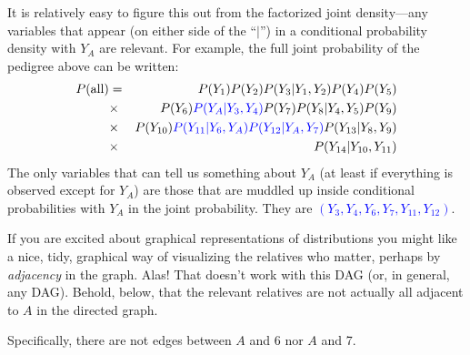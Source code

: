 \documentclass[11pt]{article}
\begin{document}
It is relatively easy to figure this out from the factorized joint density---any variables 
that appear (on either side of the ``$|$'') in a conditional probability density with 
$Y_A$ are relevant. For example, the full joint probability of the pedigree above can be written:
\begin{eqnarray*}
P(\mathrm{all}) & = & P(Y_1)P(Y_2)P(Y_3|Y_1,Y_2)P(Y_4)P(Y_5) \\
  & \times  & P(Y_6)\textcolor{blue}{P(Y_A|Y_3,Y_4)}P(Y_7)P(Y_8|Y_4,Y_5)P(Y_9) \\
  & \times  & P(Y_{10})\textcolor{blue}{P(Y_{11}|Y_6,Y_A)P(Y_{12}|Y_A,Y_7)}P(Y_{13}|Y_8,Y_9) \\
  & \times  & P(Y_{14}|Y_{10},Y_{11})
\end{eqnarray*}
The only variables that can tell us something about $Y_A$ (at least if everything is 
observed except for $Y_A$) are those that are muddled up inside conditional probabilities
with $Y_A$ in the joint
probability.  They are \textcolor{blue}{$(Y_3, Y_4, Y_6, Y_7, Y_{11}, Y_{12})$}.

If you are excited about graphical representations of distributions you might like a
nice, tidy, graphical way of visualizing the relatives who matter, perhaps by {\em adjacency} 
in the graph. Alas! That doesn't work with this DAG (or, in general, any DAG).
Behold, below, that the
relevant relatives are not actually all adjacent to $A$ in the directed graph.
\begin{center}
\end{center}
Specifically, there are not edges between $A$ and 6 nor $A$ and 7.
\end{document}
